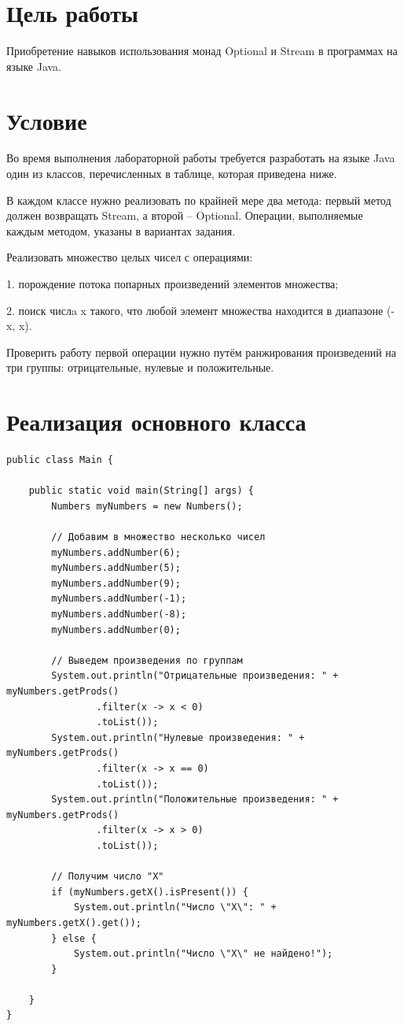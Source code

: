 \documentclass[a4paper, 14pt]{extarticle}
\begin{document}
\newpage
\section{Цель работы}
Приобретение навыков использования монад Optional и Stream в программах на языке
Java.

\section{Условие}
Во время выполнения лабораторной работы требуется разработать на языке Java один
из классов, перечисленных в таблице, которая приведена ниже.

В каждом классе нужно реализовать по крайней мере два метода: первый метод
должен возвращать Stream, а второй – Optional. Операции, выполняемые каждым методом,
указаны в вариантах задания.

Реализовать множество целых чисел с операциями:

1. порождение потока попарных произведений элементов множества;

2. поиск числa x такого, что любой элемент множества находится в диапазоне (-x, x).

Проверить работу первой операции нужно путём ранжирования произведений на три
группы: отрицательные, нулевые и положительные.

\section{Реализация основного класса}
{\scriptsize
\begin{verbatim}
public class Main {

    public static void main(String[] args) {
        Numbers myNumbers = new Numbers();

        // Добавим в множество несколько чисел
        myNumbers.addNumber(6);
        myNumbers.addNumber(5);
        myNumbers.addNumber(9);
        myNumbers.addNumber(-1);
        myNumbers.addNumber(-8);
        myNumbers.addNumber(0);

        // Выведем произведения по группам
        System.out.println("Отрицательные произведения: " + myNumbers.getProds()
                .filter(x -> x < 0)
                .toList());
        System.out.println("Нулевые произведения: " + myNumbers.getProds()
                .filter(x -> x == 0)
                .toList());
        System.out.println("Положительные произведения: " + myNumbers.getProds()
                .filter(x -> x > 0)
                .toList());

        // Получим число "X"
        if (myNumbers.getX().isPresent()) {
            System.out.println("Число \"X\": " + myNumbers.getX().get());
        } else {
            System.out.println("Число \"X\" не найдено!");
        }

    }
}

\end{verbatim}
}
\end{document}
